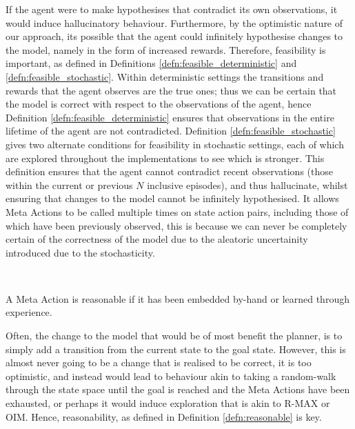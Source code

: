 If the agent were to make hypothesises that contradict its own observations, it would induce hallucinatory behaviour. Furthermore, by the optimistic nature of our approach, its possible that the agent could infinitely hypothesise changes to the model, namely in the form of increased rewards. Therefore, feasibility is important, as defined in Definitions \ref{defn:feasible_deterministic} and \ref{defn:feasible_stochastic}. Within deterministic settings the transitions and rewards that the agent observes are the true ones; thus we can be certain that the model is correct with respect to the observations of the agent, hence Definition \ref{defn:feasible_deterministic} ensures that observations in the entire lifetime of the agent are not contradicted. Definition \ref{defn:feasible_stochastic} gives two alternate conditions for feasibility in stochastic settings, each of which are explored throughout the implementations to see which is stronger. This definition ensures that the agent cannot contradict recent observations (those within the current or previous $N$ inclusive episodes), and thus hallucinate, whilst ensuring that changes to the model cannot be infinitely hypothesised. It allows Meta Actions to be called multiple times on state action pairs, including those of which have been previously observed, this is because we can never be completely certain of the correctness of the model due to the aleatoric uncertainity introduced due to the stochasticity.


\\
\begin{defn}
\label{defn:reasonable}
A Meta Action is reasonable if it has been embedded by-hand or learned through experience.
\end{defn}
Often, the change to the model that would be of most benefit the planner, is to simply add a transition from the current state to the goal state. However, this is almost never going to be a change that is realised to be correct, it is too optimistic, and instead would lead to behaviour akin to taking a random-walk through the state space until the goal is reached and the Meta Actions have been exhausted, or perhaps it would induce exploration that is akin to R-MAX or OIM. Hence, reasonability, as defined in Definition \ref{defn:reasonable} is key.
